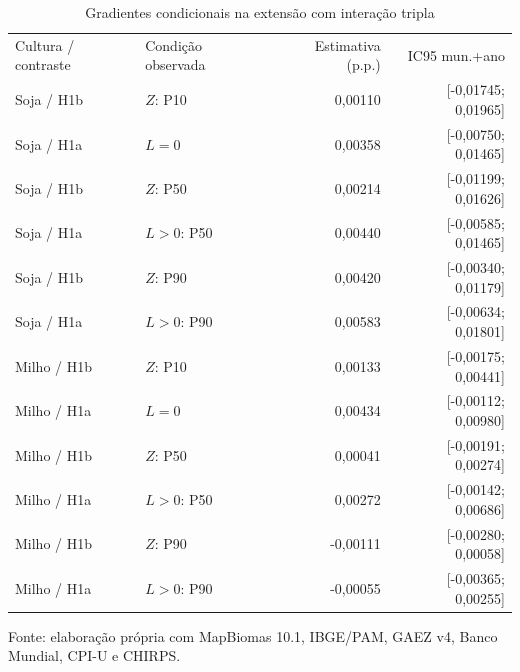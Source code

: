 \begin{table}[htbp]
\centering
\small
\setlength{\tabcolsep}{3pt}
\renewcommand{\arraystretch}{1.1}
\normalcaption\captionstyle{\centering}
\caption{Gradientes condicionais na extensão com interação tripla}
\label{tab:h1-cenarios-tripla}
\begin{tabular}{llrr}
\hline
Cultura / contraste & Condição observada & Estimativa (p.p.) & IC95 mun.+ano \\
Soja / H1b & $Z$: P10 & 0,00110 & [-0,01745; 0,01965] \\
Soja / H1a & $L=0$ & 0,00358 & [-0,00750; 0,01465] \\
Soja / H1b & $Z$: P50 & 0,00214 & [-0,01199; 0,01626] \\
Soja / H1a & $L>0$: P50 & 0,00440 & [-0,00585; 0,01465] \\
Soja / H1b & $Z$: P90 & 0,00420 & [-0,00340; 0,01179] \\
Soja / H1a & $L>0$: P90 & 0,00583 & [-0,00634; 0,01801] \\
Milho / H1b & $Z$: P10 & 0,00133 & [-0,00175; 0,00441] \\
Milho / H1a & $L=0$ & 0,00434 & [-0,00112; 0,00980] \\
Milho / H1b & $Z$: P50 & 0,00041 & [-0,00191; 0,00274] \\
Milho / H1a & $L>0$: P50 & 0,00272 & [-0,00142; 0,00686] \\
Milho / H1b & $Z$: P90 & -0,00111 & [-0,00280; 0,00058] \\
Milho / H1a & $L>0$: P90 & -0,00055 & [-0,00365; 0,00255] \\
\hline\end{tabular}
\par\smallskip
\begin{minipage}{\textwidth}\footnotesize\centering
Fonte: elaboração própria com MapBiomas 10.1, IBGE/PAM, GAEZ v4, Banco Mundial, CPI-U e CHIRPS.
\end{minipage}
\end{table}
